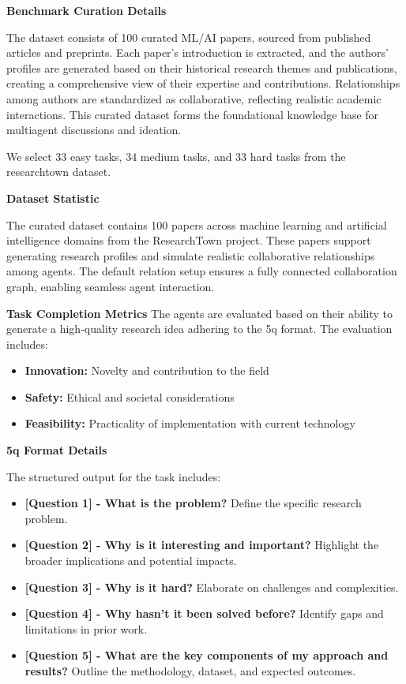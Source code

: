 \textbf{Benchmark Curation Details}

The dataset consists of 100 curated ML/AI papers, sourced from published articles and preprints. Each paper’s introduction is extracted, and the authors’ profiles are generated based on their historical research themes and publications, creating a comprehensive view of their expertise and contributions. Relationships among authors are standardized as collaborative, reflecting realistic academic interactions. This curated dataset forms the foundational knowledge base for multiagent discussions and ideation.

We select 33 easy tasks, 34 medium tasks, and 33 hard tasks from the researchtown dataset.

\textbf{Dataset Statistic}

The curated dataset contains 100 papers across machine learning and artificial intelligence domains from the ResearchTown\citep{yu2024researchtownsimulatorhumanresearch} project. These papers support generating research profiles and simulate realistic collaborative relationships among agents. The default relation setup ensures a fully connected collaboration graph, enabling seamless agent interaction.

\textbf{Task Completion Metrics}
\label{research_task_metric}
The agents are evaluated based on their ability to generate a high-quality research idea adhering to the 5q format. The evaluation includes:
\begin{itemize}
    \item \textbf{Innovation:} Novelty and contribution to the field
    \item \textbf{Safety:} Ethical and societal considerations
    \item \textbf{Feasibility:} Practicality of implementation with current technology
\end{itemize}

\textbf{5q Format Details}

The structured output for the task includes:
\begin{itemize}
    \item \textbf{[Question 1] - What is the problem?} Define the specific research problem.
    \item \textbf{[Question 2] - Why is it interesting and important?} Highlight the broader implications and potential impacts.
    \item \textbf{[Question 3] - Why is it hard?} Elaborate on challenges and complexities.
    \item \textbf{[Question 4] - Why hasn't it been solved before?} Identify gaps and limitations in prior work.
    \item \textbf{[Question 5] - What are the key components of my approach and results?} Outline the methodology, dataset, and expected outcomes.
\end{itemize}

